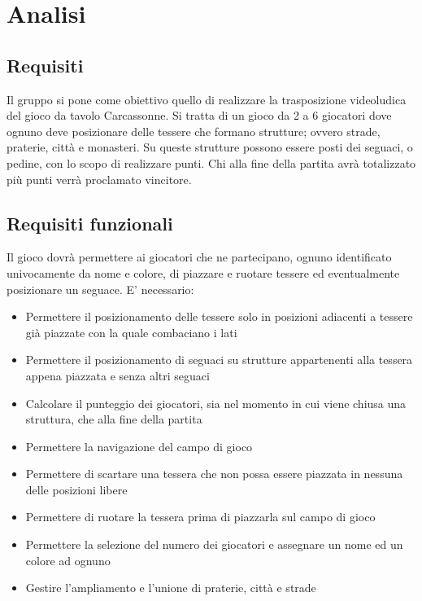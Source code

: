 \section{Analisi}
\subsection{Requisiti}

Il gruppo si pone come obiettivo quello di realizzare la trasposizione videoludica del gioco da tavolo Carcassonne. Si tratta di un gioco da 2 a 6 giocatori dove ognuno deve posizionare delle tessere che formano strutture; ovvero strade, praterie, città e monasteri. Su queste strutture possono essere posti dei seguaci, o pedine, con lo scopo di realizzare punti. Chi alla fine della partita avrà totalizzato più punti verrà proclamato vincitore. 

\subsection*{Requisiti funzionali}
Il gioco dovrà permettere ai giocatori che ne partecipano, ognuno identificato univocamente da nome e colore, di piazzare e ruotare tessere ed eventualmente posizionare un seguace. E' necessario:

\begin{itemize}
\item Permettere il posizionamento delle tessere solo in posizioni adiacenti a tessere già piazzate con la quale combaciano i lati
\item Permettere il posizionamento di seguaci su strutture appartenenti alla tessera appena piazzata e senza altri seguaci
\item Calcolare il punteggio dei giocatori, sia nel momento in cui viene chiusa una struttura, che alla fine della partita
\item Permettere la navigazione del campo di gioco
\item Permettere di scartare una tessera che non possa essere piazzata in nessuna delle posizioni libere
\item Permettere di ruotare la tessera prima di piazzarla sul campo di gioco
\item Permettere la selezione del numero dei giocatori e assegnare un nome ed un colore ad ognuno
\item Gestire l'ampliamento e l'unione di praterie, città e strade
\end{itemize}

